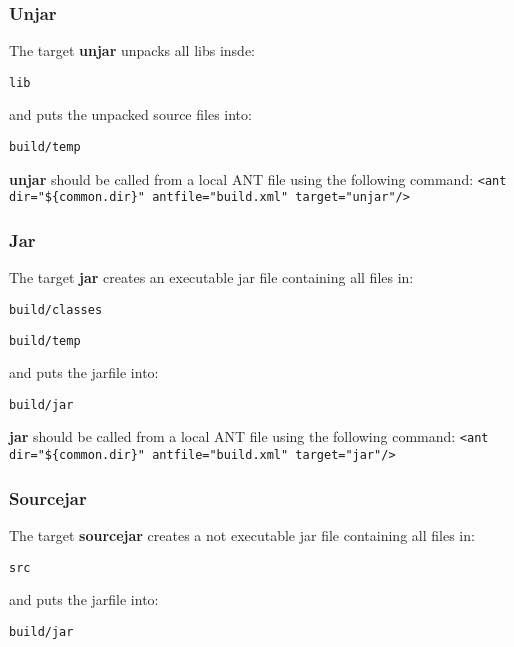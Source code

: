 \documentclass
[
		a4paper,
		twoside, 										
		BCOR10mm,											
		11pt,												
		halfparskip,								
		bigheadings,								
		notitlepage,			
		pdftex											
]
{scrartcl}
\begin{document}
\subsubsection{Unjar}
\label{Unjar}

The target \textbf{unjar} unpacks all libs insde:
\footnotesize
\begin{compactitem}
	\item \texttt{lib}
\end{compactitem}
\normalsize
and puts the unpacked source files into:
\footnotesize
\begin{compactitem}
	\item \texttt{build/temp}
\end{compactitem}
\normalsize

\textbf{unjar} should be called from a local ANT file using the following command: 
\footnotesize
\verb|<ant dir="${common.dir}" antfile="build.xml" target="unjar"/>|
\normalsize


\subsubsection{Jar}
\label{Jar}

The target \textbf{jar} creates an executable jar file containing all files in:
\footnotesize
\begin{compactitem}
	\item \texttt{build/classes}
	\item \texttt{build/temp}
\end{compactitem}
\normalsize
and puts the jarfile into:
\footnotesize
\begin{compactitem}
	\item \texttt{build/jar}
\end{compactitem}
\normalsize

\textbf{jar} should be called from a local ANT file using the following command: 
\footnotesize
\verb|<ant dir="${common.dir}" antfile="build.xml" target="jar"/>|
\normalsize


\subsubsection{Sourcejar}
\label{Sourcejar}

The target \textbf{sourcejar} creates a not executable jar file containing all files in:
\footnotesize
\begin{compactitem}
	\item \texttt{src}
\end{compactitem}
\normalsize
and puts the jarfile into:
\footnotesize
\begin{compactitem}
	\item \texttt{build/jar}
\end{compactitem}
\normalsize
\end{document}
